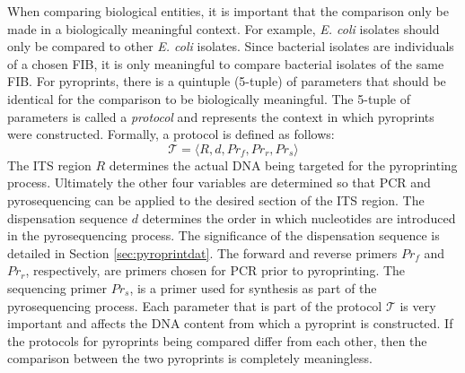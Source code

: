 \documentclass[12pt]{ucthesis}
\begin{document}
      When comparing biological entities, it is important that the comparison
      only be made in a biologically meaningful context. For example,
      \textit{E. coli} isolates should only be compared to other \textit{E.
      coli} isolates. Since bacterial isolates are individuals of a chosen FIB,
      it is only meaningful to compare bacterial isolates of the same FIB. For
      pyroprints, there is a quintuple (5-tuple) of parameters that should be
      identical for the comparison to be biologically meaningful. The 5-tuple
      of parameters is called a \textit{protocol} and represents the context in
      which pyroprints were constructed. Formally, a protocol is defined as
      follows:
      $$\mathcal{T} = \langle R, d, Pr_{f}, Pr_{r}, Pr_{s} \rangle$$
      The ITS region $R$ determines the actual DNA being targeted for the
      pyroprinting process. Ultimately the other four variables are determined
      so that PCR and pyrosequencing can be applied to the desired section of
      the ITS region. The dispensation sequence $d$ determines the order in
      which nucleotides are introduced in the pyrosequencing process. The
      significance of the dispensation sequence is detailed in Section
      \ref{sec:pyroprintdat}. The forward and reverse primers $Pr_{f}$ and
      $Pr_{r}$, respectively, are primers chosen for PCR prior to pyroprinting.
      The sequencing primer $Pr_{s}$, is a primer used for synthesis as part of
      the pyrosequencing process. Each parameter that is part of the protocol
      $\mathcal{T}$ is very important and affects the DNA content from which a
      pyroprint is constructed. If the protocols for pyroprints being compared
      differ from each other, then the comparison between the two pyroprints is
      completely meaningless.
\end{document}
